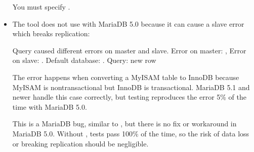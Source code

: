 \documentclass[letterpaper,10pt,english]{sphinxmanual}
\begin{document}
\begin{fulllineitems}
\begin{itemize}
You must specify .

\item {} 
The tool does not use  with MariaDB 5.0 because it can
cause a slave error which breaks replication:

\begin{sphinxVerbatim}[commandchars=\\\{\}]
Query caused different errors on master and slave. Error on master:
 ,
Error on slave:  . Default database: .
Query: new row
\end{sphinxVerbatim}

The error happens when converting a MyISAM table to InnoDB because MyISAM
is non\sphinxhyphen{}transactional but InnoDB is transactional.  MariaDB 5.1 and newer
handle this case correctly, but testing reproduces the error 5\% of the time
with MariaDB 5.0.

This is a MariaDB bug, similar to ,
but there is no fix or workaround in MariaDB 5.0.  Without ,
tests pass 100\% of the time, so the risk of data loss or breaking replication
should be negligible.


\end{itemize}

\end{fulllineitems}

\end{document}
